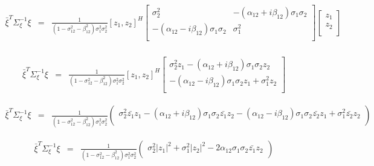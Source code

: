 \documentclass[10pt,a4paper]{article}
\begin{document}
\begin{equation}\label{sec2eqn6}
\begin{array}{ccc}
	\bar{\xi}^{T}\Sigma_{\xi}^{-1}\xi&=&\frac{1}{(1 - \sigma_{12}^{2}- \beta_{12}^2)\sigma_{1}^2\sigma_{2}^2} [z_1,z_2]^{H}\left[
\begin{array}{cc}
	\sigma_2^2                                &  -(\alpha_{12}+i\beta_{12})\sigma_1\sigma_2  \\
	-(\alpha_{12}-i\beta_{12})\sigma_1\sigma_2 & \sigma_1^2 \\
\end{array}
\right]
	\left[
\begin{array}{c}
	z_1  \\
	z_2 \\
\end{array}\right]\\
\end{array}
\end{equation}

\begin{equation}\label{sec2eqn7}
\begin{array}{ccc}
	\bar{\xi}^{T}\Sigma_{\xi}^{-1}\xi&=&\frac{1}{(1 - \sigma_{12}^{2}- \beta_{12}^2)\sigma_{1}^2\sigma_{2}^2} [z_1,z_2]^{H}\left[
\begin{array}{cc}
	\sigma_2^2z_1-(\alpha_{12}+i\beta_{12})\sigma_1\sigma_2z_2  \\
	-(\alpha_{12}-i\beta_{12})\sigma_1\sigma_2z_1+\sigma_1^2z_2 \\
\end{array}
\right]
\end{array}
\end{equation}

\begin{equation}\label{sec2eqn8}
\begin{array}{ccc}
	\bar{\xi}^{T}\Sigma_{\xi}^{-1}\xi&=&\frac{1}{(1 - \sigma_{12}^{2}- \beta_{12}^2)\sigma_{1}^2\sigma_{2}^2}\left(
\begin{array}{c}
	\sigma_2^2\bar{z_1}z_1-(\alpha_{12}+i\beta_{12})\sigma_1\sigma_2\bar{z_1}z_2 
	-(\alpha_{12}-i\beta_{12})\sigma_1\sigma_2\bar{z_2}z_1+\sigma_1^2\bar{z_2}z_2 \\
\end{array}
	\right)
\end{array}
\end{equation}

\begin{equation}\label{sec2eqn9}
\begin{array}{ccc}
	\bar{\xi}^{T}\Sigma_{\xi}^{-1}\xi&=&\frac{1}{(1 - \sigma_{12}^{2}- \beta_{12}^2)\sigma_{1}^2\sigma_{2}^2}\left(
\begin{array}{c}
	\sigma_2^2|z_1|^2+\sigma_1^2|z_2|^2-2\alpha_{12}\sigma_1\sigma_2\bar{z_1}z_2 \\
\end{array}
	\right)
\end{array}
\end{equation}
\end{document}
